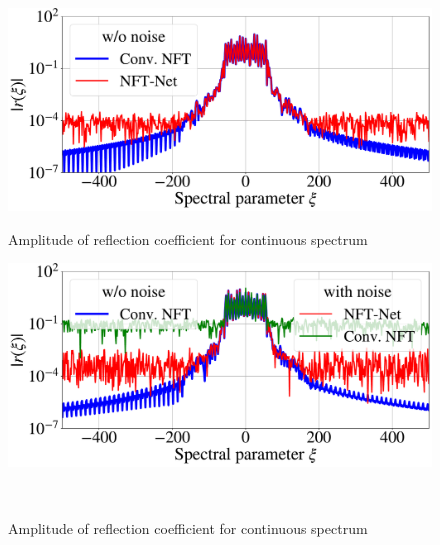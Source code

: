 \begin{figure}[htbp]
\begin{minipage}{.47\textwidth}
  \centering
  \includegraphics[width=1.\linewidth]{images/nn_nft/scirep_cont_spec_example.pdf}
  \caption{Amplitude of reflection coefficient for continuous spectrum}
  \label{fig:won_spectrum}
\end{minipage}
\hfill
\begin{minipage}{.47\textwidth}
  \centering
  \includegraphics[width=1.\linewidth]{images/nn_nft/scirep_cont_spec_wn_example.pdf}
  \caption{Amplitude of reflection coefficient for continuous spectrum}
  \label{fig:wn_spectrum}
\end{minipage}
\\


\end{figure}

